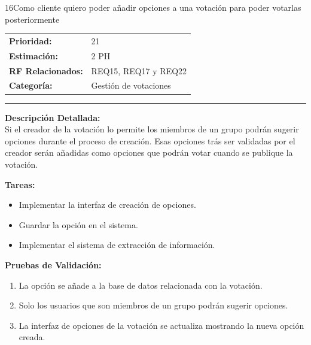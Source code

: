 \begin{hu_card}{16}{Como cliente quiero poder añadir opciones a una votación para poder votarlas posteriormente}
    \begin{tabularx}{\linewidth}{l X}
        \textbf{Prioridad:}   & 21\\
        \textbf{Estimación:}  & 2 PH \\
        \textbf{RF Relacionados:} & REQ15, REQ17 y REQ22 \\
        \textbf{Categoría:} & Gestión de votaciones \\
    \end{tabularx}

    \vspace{2mm}
    \hrule
    \vspace{2mm}

    \textbf{Descripción Detallada:} \\
    Si el creador de la votación lo permite los miembros de un grupo podrán sugerir opciones durante el proceso de creación. Esas opciones trás ser validadas por el creador serán añadidas como opciones que podrán votar cuando se publique la votación.

    \vspace{2mm}
    \textbf{Tareas:}
    \begin{itemize}[noitemsep, topsep=0pt]
        \item Implementar la interfaz de creación de opciones.
        \item Guardar la opción en el sistema.
        \item Implementar el sistema de extracción de información.
    \end{itemize}

    \vspace{2mm}
    \textbf{Pruebas de Validación:}
    \begin{enumerate}[noitemsep, topsep=0pt]
        \item La opción se añade a la base de datos relacionada con la votación.
        \item Solo los usuarios que son miembros de un grupo podrán sugerir opciones.
        \item La interfaz de opciones de la votación se actualiza mostrando la nueva opción creada.
    \end{enumerate}
\end{hu_card}

